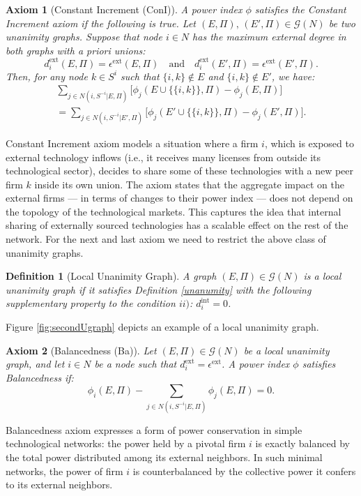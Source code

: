 \documentclass[preprint,11pt,authoryear]{elsarticle}
\theoremstyle{plain}
\newtheorem{definition}[theorem]{Definition}
\newtheorem{axiom}{Axiom}
\begin{document}
\begin{axiom}[Constant Increment (ConI)]\label{Ax-ci}
A power index $\phi$ satisfies the \emph{Constant Increment} axiom 
if the following is true. Let $(E, \Pi), \, (E', \Pi) \in \mathcal{G}(N)$ be two unanimity graphs.
Suppose that node $i \in N$ has the \emph{maximum external degree} 
in both graphs with a priori unions:
\[
d_i^{\text{ext}}(E, \Pi) = \epsilon^{\text{ext}}(E, \Pi) \quad \text{and} \quad d_i^{\text{ext}}(E', \Pi) = \epsilon^{\text{ext}}(E', \Pi).
\]
Then, for any node $k \in S^i$ such that $\{i,k\} \notin E$ and $\{i,k\} \notin E'$, we have:
\begin{multline*} 
\sum_{j \in N(i, S^{-i}| E, \Pi)} \big[ \phi_j(E \cup \{\{i,k\}\}, \Pi) - \phi_j(E, \Pi) \big]
\\ =
\sum_{j \in N(i, S^{-i}| E', \Pi)} \big[ \phi_j(E' \cup \{\{i,k\}\}, \Pi) - \phi_j(E', \Pi) \big].
\end{multline*}
\end{axiom}
Constant Increment axiom models a situation where a firm $i$, which 
is exposed to external technology inflows 
(i.e., it receives many licenses from outside its technological sector), 
decides to share some of these technologies with a new peer firm 
$k$ inside its own union. The axiom states 
that the aggregate impact on the external firms 
— in terms of changes to their power index — does 
not depend on the topology of the technological markets. 
This captures the idea that internal sharing of externally 
sourced technologies has a scalable effect on the rest of the network.
For the next and last axiom we need to restrict the above class of unanimity graphs. 
\begin{definition}[Local Unanimity Graph]
A graph $(E,\Pi)\in\mathcal{G}(N)$ is a \emph{local unanimity graph} if 
it satisfies Definition \ref{unanumity} with the following supplementary property to the condition $ii)$: $d_i^{\text{int}}=0$.   
\end{definition}
Figure \eqref{fig:secondUgraph} depicts an example of a local unanimity graph.  

\begin{axiom}[Balancedness (Ba)]\label{Ax-Ba}
Let $(E,\Pi)\in\mathcal{G}(N)$ be a \emph{local unanimity graph}, and let $i \in N$ be a node such that $d_i^{\text{ext}} = \epsilon^{\text{ext}}$. A power index $\phi$ satisfies \emph{Balancedness} if:
\begin{equation*}
    \phi_i(E, \Pi)  -  \sum_{j \in N(i, S^{-i}|E,\Pi)} \phi_j(E, \Pi) = 0.
\end{equation*}
\end{axiom}
Balancedness axiom expresses a form of power conservation in simple technological networks: the power held by a pivotal firm $i$ is exactly balanced by the total power distributed among its external neighbors. In such minimal networks, the power of firm $i$ is counterbalanced by the collective power it confers to its external neighbors.\\
\end{document}
